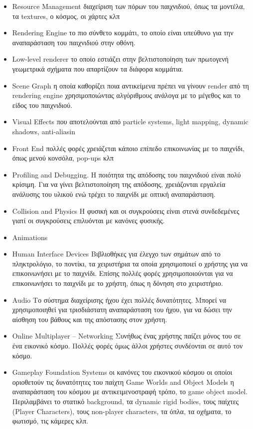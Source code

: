 \begin{itemize}
\item Resource Management διαχείριση των πόρων του παιχνιδιού, όπως τα μοντέλα, τα textures, ο κόσμος, οι χάρτες κλπ
\item Rendering Engine το πιο σύνθετο κομμάτι, το οποίο είναι υπεύθυνο για την αναπαράσταση του παιχνιδιού στην οθόνη.
\item Low-level renderer  το οποίο εστιάζει στην βελτιστοποίηση των πρωτογενή γεωμετρικά σχήματα
που απαρτίζουν τα διάφορα κομμάτια.
\item Scene Graph η οποία καθορίζει ποια αντικείμενα πρέπει να γίνουν render από τη rendering engine χρησιμοποιώντας αλγόριθμους ανάλογα με το μέγεθος και το είδος του παιχνιδιού.
\item Visual Effects που αποτελούνται από particle systems, light mapping, dynamic shadows, anti-aliasin 
\item Front End πολλές φορές χρειάζεται κάποιο επίπεδο επικοινωνίας με το παιχνίδι, όπως μενού κονσόλα, pop-ups κλπ
\item Profiling and Debugging. Η ποιότητα της απόδοσης του παιχνιδιού είναι πολύ κρίσιμη. Για να γίνει βελτιστοποίηση της απόδοσης, χρειάζονται εργαλεία ανάλυσης του υλικού ενώ τρέχει το παιχνίδι με οπτική αναπαράσταση.
\item Collision and Physics
Η φυσική και οι συγκρούσεις είναι στενά συνδεδεμένες γιατί οι συγκρούσεις επιλυόνται με κανόνες φυσικής.
\item Animations
\item Human Interface Devices
Βιβλιοθήκες για έλεγχο των σημάτων από το πληκτρολόγιο, το ποντίκι, τα χειριστήρια τα οποία χρησιμοποιεί ο χρήστης για να επικοινωνήσει με το παιχνίδι. Επίσης πολλές φορές χρησιμοποιούνται για να επικοινωνήσει το παιχνίδι με το χρήστη, όπως η δόνηση στο χειριστήριο.
\item Audio
Το σύστημα διαχείρισης ήχου έχει πολλές δυνατότητες. Μπορεί να χρησιμοποιηθεί για τρισδιάστατη αναπαράσταση του ήχου, για να δώσει την αίσθηση του βάθους και της απόστασης στον χρήστη.
\item Online Multiplayer – Networking
Συνήθως ένας χρήστης παίζει μόνος του σε ένα εικονικό κόσμο. Πολλές φορές όμως άλλοι χρήστες συνδέονται σε αυτό τον κόσμο.
\item Gameplay Foundation Systems οι κανόνες του εικονικού κόσμου οι οποίοι οριοθετούν τις δυνατότητες του παίχτη
Game Worlds and Object Models
η αναπαράσταση του κόσμου με αντικειμενοστραφή τρόπο, το game object model.
Περιλαμβάνει το στατικό background, τα dynamic rigid bodies, τους παίχτες (Player Characters), τους non-player characters, τα όπλα, τα οχήματα, το φωτισμό, τις κάμερες κλπ.

\end{itemize}
